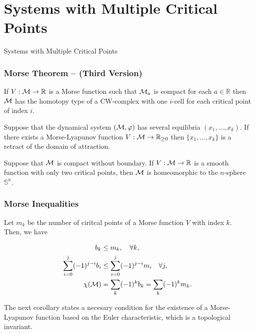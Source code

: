 \section{Systems with Multiple Critical Points}

\begin{frame}
    Systems with Multiple Critical Points


\end{frame}

\begingroup
\small


\begin{frame}
    \frametitle{Morse Theorem -- (Third Version)}

    \begin{theorem}
        If $V: \mathcal{M} \rightarrow \mathbb{R}$ is a Morse function such that 
        $\mathcal{M}_a$ is compact for each $a \in \mathbb{R}$ then $\mathcal{M}$ has the 
        homotopy type of a CW-complex with one $i$-cell for each critical point 
        of index $i$.
    \end{theorem}
    
    \begin{corollary}
        Suppose that the dynamical system $(\mathcal{M}, \varphi)$ has several
        equilibria $(x_1, \ldots, x_k)$. If there exists a Morse-Lyapunov
        function $V: \mathcal{M} \rightarrow \mathbb{R}_{\geq 0}$ then $\{x_1,
        \ldots, x_k\}$ is a retract of the domain of attraction.
    \end{corollary}

    \begin{prop}
        Suppose that $\mathcal{M}$ is compact without boundary. If $V: \mathcal{M}
        \rightarrow \mathbb{R}$ is a smooth function with only two critical
        points, then $\mathcal{M}$ is homeomorphic to the $n$-sphere $\mathbb{S}^n$.
    \end{prop}
\end{frame}

\begin{frame}
    \frametitle{Morse Inequalities}

    \begin{theorem}
        Let $m_k$ be the number of ciritcal points of a Morse function $V$ with
        index $k$. Then, we have

        \begin{align*}
            b_k &\leq m_k, \quad \forall k, \\
            \sum_{i=0}^j (-1)^{j-i}b_i &\leq \sum_{i=0}^j (-1)^{j-i}m_i \quad \forall j, \\
            \chi(\mathcal{M}) &= \sum_k (-1)^k b_k = \sum_k (-1)^k m_k.
        \end{align*}
    \end{theorem}

    The next corollary states a necesary condition for the existence of a
    Morse-Lyapunov function based on the Euler characteristic, which is a
    topological invariant.
\end{frame}


